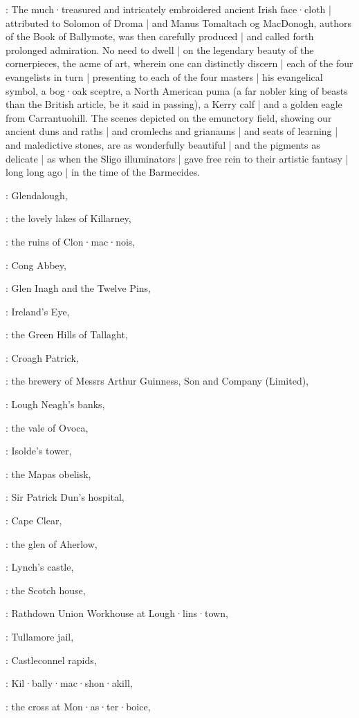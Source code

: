 :
The much·treasured and intricately embroidered ancient Irish face·cloth |
attributed to Solomon of Droma |
and Manus Tomaltach og MacDonogh,
authors of the Book of Ballymote,
was then carefully produced |
and called forth prolonged admiration.
No need to dwell |
on the legendary beauty of the cornerpieces,
the acme of art,
wherein one can distinctly discern |
each of the four evangelists in turn |
presenting to each of the four masters |
his evangelical symbol,
a bog·oak sceptre,
a North American puma
(a far nobler king of beasts than the British article,
be it said in passing),
a Kerry calf |
and a golden eagle from Carrantuohill.
The scenes depicted on the emunctory field,
showing our ancient duns and raths |
and cromlechs and grianauns |
and seats of learning |
and maledictive stones,
are as wonderfully beautiful |
and the pigments as delicate |
as when the Sligo illuminators |
gave free rein to their artistic fantasy |
long long ago |
in the time of the Barmecides.

:
Glendalough,

:
the lovely lakes of Killarney,

:
the ruins of Clon·mac·nois,

:
Cong Abbey,

:
Glen Inagh and the Twelve Pins,

:
Ireland's Eye,

:
the Green Hills of Tallaght,

:
Croagh Patrick,

:
the brewery of Messrs Arthur Guinness,
Son and Company (Limited),

:
Lough Neagh's banks,

:
the vale of Ovoca,

:
Isolde's tower,

:
the Mapas obelisk,

:
Sir Patrick Dun's hospital,

:
Cape Clear,

:
the glen of Aherlow,

:
Lynch's castle,

:
the Scotch house,

:
Rathdown Union Workhouse at Lough·lins·town,

:
Tullamore jail,

:
Castleconnel rapids,

:
Kil·bally·mac·shon·akill,

:
the cross at Mon·as·ter·boice,

